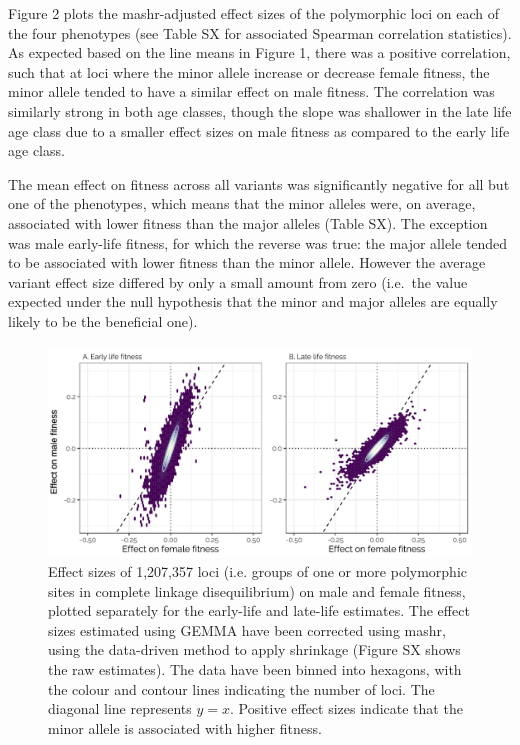 \documentclass{article}
\begin{document}
Figure 2 plots the mashr-adjusted effect sizes of the polymorphic loci
on each of the four phenotypes (see Table SX for associated Spearman
correlation statistics). As expected based on the line means in Figure
1, there was a positive correlation, such that at loci where the minor
allele increase or decrease female fitness, the minor allele tended to
have a similar effect on male fitness. The correlation was similarly
strong in both age classes, though the slope was shallower in the late
life age class due to a smaller effect sizes on male fitness as compared
to the early life age class.

The mean effect on fitness across all variants was significantly
negative for all but one of the phenotypes, which means that the minor
alleles were, on average, associated with lower fitness than the major
alleles (Table SX). The exception was male early-life fitness, for which
the reverse was true: the major allele tended to be associated with
lower fitness than the minor allele. However the average variant effect
size differed by only a small amount from zero (i.e.~the value expected
under the null hypothesis that the minor and major alleles are equally
likely to be the beneficial one).

\begin{figure}[h]
\centering
\includegraphics[width=1.0\textwidth]{../figures/SNP_effect_ED.pdf}
\caption{\footnotesize{Effect sizes of 1,207,357 loci (i.e. groups of one or more polymorphic sites in complete linkage disequilibrium) on male and female fitness, plotted separately for the early-life and late-life estimates. The effect sizes estimated using GEMMA have been corrected using mashr, using the data-driven method to apply shrinkage (Figure SX shows the raw estimates). The data have been binned into hexagons, with the colour and contour lines indicating the number of loci. The diagonal line represents $y=x$. Positive effect sizes indicate that the minor allele is associated with higher fitness.}}
\end{figure}
\newpage
\end{document}
